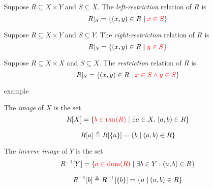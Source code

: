 \begin{frame}{}
  \begin{definition}
    Suppose $R \subseteq X \times Y$ and $S \subseteq X$.
    The {\it left-restriction} relation of $R$  is
    \[
      R|_{S} = \{(x, y) \in R \mid \textcolor{red}{x \in S}\}
    \]
  \end{definition}

  \pause
  \vspace{0.50cm}
  \begin{definition}
    Suppose $R \subseteq X \times Y$ and $S \subseteq Y$.
    The {\it right-restriction} relation of $R$  is
    \[
      R|_{S} = \{(x, y) \in R \mid \textcolor{red}{y \in S}\}
    \]
  \end{definition}

  \pause
  \vspace{0.50cm}
  \begin{definition}[限制 (Restriction)]
    Suppose $R \subseteq X \times X$ and $S \subseteq X$.
    The {\it restriction} relation of $R$  is
    \[
      R|_{S} = \{(x, y) \in R \mid \textcolor{red}{x \in S \land y \in S}\}
    \]
  \end{definition}
\end{frame}

\begin{frame}{}
  example
\end{frame}

\begin{frame}{}
  \begin{definition}[像 (Image)]
    The {\it image} of $X$  is the set
    \[
      R[X] = \{\textcolor{red}{b \in \text{ran}(R)} \mid \exists a \in X.\; (a, b) \in R\}
    \]
  \end{definition}

  \pause
  \[
    R[a] \triangleq R[\{a\}] = \{b \mid (a, b) \in R\}
  \]
\end{frame}

\begin{frame}{}
  \begin{definition}
    The {\it inverse image} of $Y$  is the set
    \[
      R^{-1}[Y] = \{\textcolor{red}{a \in \text{dom}(R)} \mid \exists b \in Y: (a, b) \in R\}
    \]
  \end{definition}

  \pause
  \[
    R^{-1}[b] \triangleq R^{-1}[\{b\}] = \{a \mid (a, b) \in R\}
  \]
\end{frame}

